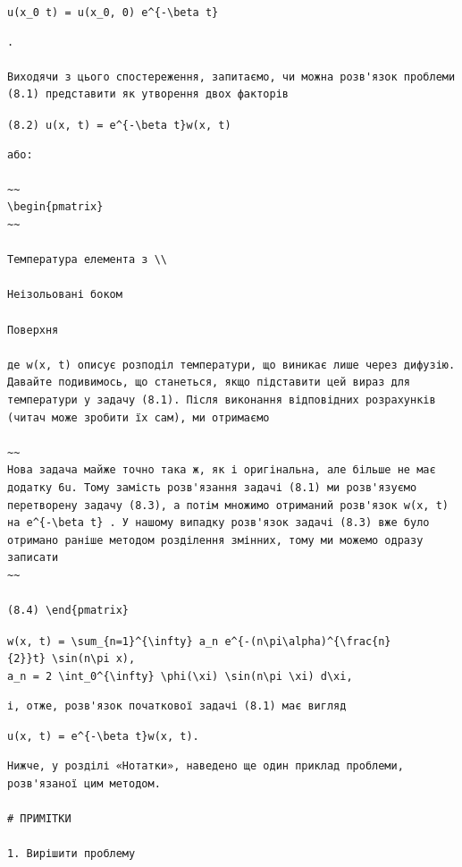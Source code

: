 \documentclass[
  ukrainian,
]{article}
\begin{document}
\texttt{u(x\_0\ t)\ =\ u(x\_0,\ 0)\ e\^{}\{-\textbackslash{}beta\ t\}}

\begin{verbatim}
.

Виходячи з цього спостереження, запитаємо, чи можна розв'язок проблеми (8.1) представити як утворення двох факторів
\end{verbatim}

\texttt{(8.2)\ u(x,\ t)\ =\ e\^{}\{-\textbackslash{}beta\ t\}w(x,\ t)}

\begin{verbatim}
або:

~~
\begin{pmatrix}
~~

Температура елемента з \\

Неізольовані боком

Поверхня

де w(x, t) описує розподіл температури, що виникає лише через дифузію. Давайте подивимось, що станеться, якщо підставити цей вираз для температури у задачу (8.1). Після виконання відповідних розрахунків (читач може зробити їх сам), ми отримаємо

~~
Нова задача майже точно така ж, як і оригінальна, але більше не має додатку 6u. Тому замість розв'язання задачі (8.1) ми розв'язуємо перетворену задачу (8.3), а потім множимо отриманий розв'язок w(x, t) на e^{-\beta t} . У нашому випадку розв'язок задачі (8.3) вже було отримано раніше методом розділення змінних, тому ми можемо одразу записати
~~

(8.4) \end{pmatrix}
\end{verbatim}

\texttt{w(x,\ t)\ =\ \textbackslash{}sum\_\{n=1\}\^{}\{\textbackslash{}infty\}\ a\_n\ e\^{}\{-(n\textbackslash{}pi\textbackslash{}alpha)\^{}\{\textbackslash{}frac\{n\}\{2\}\}t\}\ \textbackslash{}sin(n\textbackslash{}pi\ x),}
\texttt{a\_n\ =\ 2\ \textbackslash{}int\_0\^{}\{\textbackslash{}infty\}\ \textbackslash{}phi(\textbackslash{}xi)\ \textbackslash{}sin(n\textbackslash{}pi\ \textbackslash{}xi)\ d\textbackslash{}xi,}

\begin{verbatim}
і, отже, розв'язок початкової задачі (8.1) має вигляд
\end{verbatim}

\texttt{u(x,\ t)\ =\ e\^{}\{-\textbackslash{}beta\ t\}w(x,\ t).}

\begin{verbatim}
Нижче, у розділі «Нотатки», наведено ще один приклад проблеми, розв'язаної цим методом.

# ПРИМІТКИ

1. Вирішити проблему
\end{verbatim}
\end{document}
